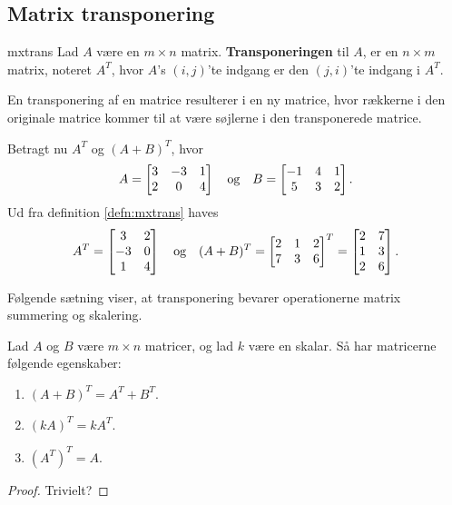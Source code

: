 \subsection{Matrix transponering}
\begin{defn}{}{mxtrans}
Lad $A$ være en $m \times n$ matrix. \textbf{Transponeringen} til $A$, er en $n \times m$ matrix, noteret $A^T$, hvor $A$'s $(i,j)$'te indgang er den $(j,i)$'te indgang i $A^T$.
\end{defn}
En transponering af en matrice resulterer i en ny matrice, hvor rækkerne i den originale matrice kommer til at være søjlerne i den transponerede matrice.

\begin{eks}\label{eks:trans}
Betragt nu $A^T$ og $(A+B)^T$, hvor 
\begin{align*}
A= 
\begin{bmatrix}
3	&	-3	&	1\\
2	&	0	&	4
\end{bmatrix}
\text{\phantom{---}og\phantom{---}}
B= 
\begin{bmatrix}
-1	&	4	&	1\\
5	&	3	&	2
\end{bmatrix}.
\end{align*}
Ud fra definition \ref{defn:mxtrans} haves
\begin{align*}
A^T =
\begin{bmatrix}
3	&	2\\
-3	&	0\\
1	&	4
\end{bmatrix}
\text{\phantom{---}og\phantom{---}}
(A+B)^T=
\begin{bmatrix}
2	&	1	&	2\\
7	&	3	&	6
\end{bmatrix}^T
=
\begin{bmatrix}
2	&	7\\
1	&	3\\
2	&	6
\end{bmatrix}.
\end{align*}
\end{eks}

Følgende sætning viser, at transponering bevarer operationerne matrix summering og skalering.
\begin{thm}{}{}
Lad $A$ og $B$ være $m \times n$ matricer, og lad $k$ være en skalar.
Så har matricerne følgende egenskaber:
\begin{enumerate}[label=(\alph*)]
\item $(A + B)^T = A^T + B^T$.
\item $(kA)^T = kA^T$.
\item $(A^T)^T = A$.
\end{enumerate}
\end{thm}

\begin{proof}
Trivielt?
\end{proof}